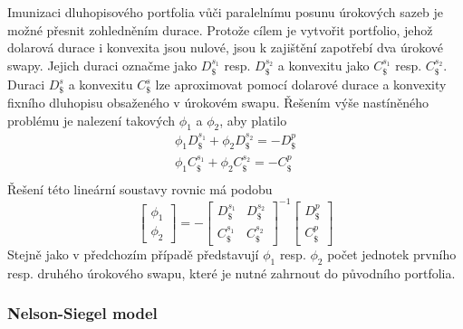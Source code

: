 \documentclass[a4paper]{book}
\begin{document}
Imunizaci dluhopisového portfolia vůči paralelnímu posunu úrokových sazeb je možné přesnit zohledněním durace. Protože cílem je vytvořit portfolio, jehož dolarová durace i konvexita jsou nulové, jsou k zajištění zapotřebí dva úrokové swapy. Jejich duraci označme jako $D_{\$}^{s_1}$ resp. $D_{\$}^{s_2}$ a konvexitu jako $C_{\$}^{s_1}$ resp. $C_{\$}^{s_2}$.   Duraci $D_{\$}^s$ a konvexitu $C_{\$}^s$ lze aproximovat pomocí dolarové durace a konvexity fixního dluhopisu obsaženého v úrokovém swapu. Řešením výše nastíněného problému je nalezení takových $\phi_1$ a $\phi_2$, aby platilo
\begin{gather*}
\phi_1 D_{\$}^{s_1} + \phi_2 D_{\$}^{s_2} = -D_{\$}^p \\
\phi_1 C_{\$}^{s_1} + \phi_2 C_{\$}^{s_2} = -C_{\$}^p \\
\end{gather*}
Řešení této lineární soustavy rovnic má podobu
\begin{equation*}
\begin{bmatrix}
\phi_1 \\
\phi_2
\end{bmatrix}
=
-
\begin{bmatrix}
D_{\$}^{s_1} &  D_{\$}^{s_2}\\
C_{\$}^{s_1} &  C_{\$}^{s_2}
\end{bmatrix}^{-1}
\begin{bmatrix}
D_{\$}^p\\
C_{\$}^p
\end{bmatrix}
\end{equation*}
Stejně jako v předchozím případě představují $\phi_1$ resp. $\phi_2$ počet jednotek prvního resp. druhého úrokového swapu, které je nutné zahrnout do původního portfolia.

\subsubsection{Nelson-Siegel model}
\end{document}
